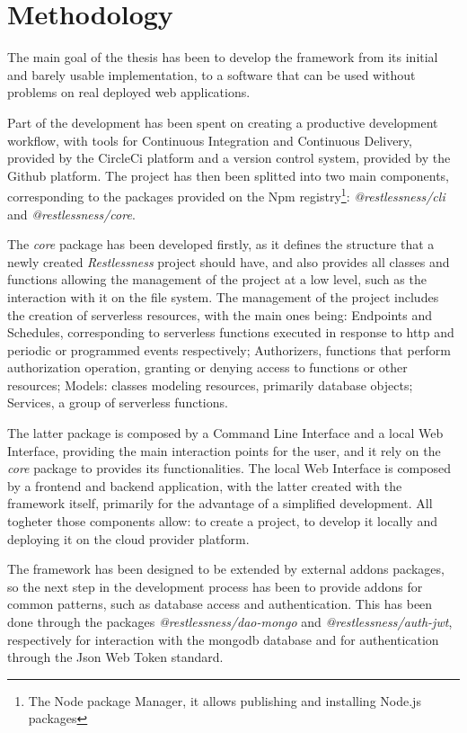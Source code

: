 \documentclass{article}
\begin{document}
\section{Methodology}
The main goal of the thesis has been to develop the framework from its initial and
barely usable implementation, to a software that can be used without problems on
real deployed web applications.

\noindent
Part of the development has been spent on creating a productive development
workflow, with tools for Continuous Integration and Continuous Delivery, provided
by the CircleCi platform and a version control system, provided by the Github
platform.
The project has then been splitted into two main components, corresponding to the
packages provided on the Npm registry\footnote{The Node package Manager, it allows
publishing and installing Node.js packages}: \mbox{\textit{@restlessness/cli}} and
\mbox{\textit{@restlessness/core}}.

\noindent
The \textit{core} package has been developed firstly, as it defines the structure
that a newly created \textit{Restlessness} project should have, and also provides
all classes and functions allowing the management of the project at a low level,
such as the interaction with it on the file system. The management of the project
includes the creation of serverless resources, with the main ones being: Endpoints
and Schedules, corresponding to serverless functions executed in response to http
and periodic or programmed events respectively; Authorizers, functions that perform
authorization operation, granting or denying access to functions or other resources;
Models: classes modeling resources, primarily database objects; Services, a group
of serverless functions.

\noindent
The latter package is composed by a Command Line Interface and a local Web Interface,
providing the main interaction points for the user, and it rely on the \textit{core}
package to provides its functionalities. The local Web Interface is composed by
a frontend and backend application, with the latter created with the framework
itself, primarily for the advantage of a simplified development.
All togheter those components allow: to create a project, to develop it locally
and deploying it on the cloud provider platform.

\noindent
The framework has been designed to be extended by external addons packages, so the
next step in the development process has been to provide addons for common patterns,
such as database access and authentication. This has been done through the packages
\mbox{\textit{@restlessness/dao-mongo}} and \mbox{\textit{@restlessness/auth-jwt}},
respectively for interaction with the mongodb database and for authentication through
the Json Web Token standard.
\end{document}

